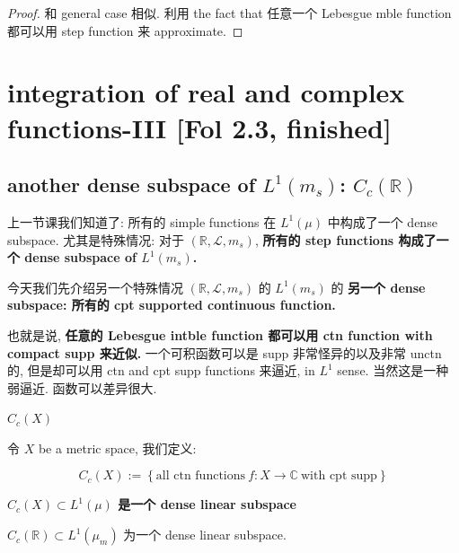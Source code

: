 \documentclass{qlnotes-export}
\begin{document}
\begin{proof}

和 general case 相似. 利用 the fact that 任意一个 Lebesgue mble function 都可以用 step function 来 approximate.

\end{proof}

\section{integration of real and complex functions-III {[}Fol 2.3, finished{]}}

\subsection{\texorpdfstring{another dense subspace of \(L^{1}(m_{s})\): \(C_{c}({\mathbb{R}})\)}{another dense subspace of L\^{}\{1\}(m\_\{s\}): C\_\{c\}(\{\textbackslash mathbb\{R\}\})}}\label{another-dense-subspace-of-l1m_s-c_cmathbbr}

上一节课我们知道了: 所有的 simple functions 在 \(L^{1}(\mu)\) 中构成了一个 dense subspace. 尤其是特殊情况: 对于 \(({\mathbb{R}},\mathcal{L},m_{s})\), \textbf{所有的 step functions 构成了一个 dense subspace of \(L^{1}(m_{s})\).}

今天我们先介绍另一个特殊情况 \(({\mathbb{R}},\mathcal{L},m_{s})\) 的 \(L^{1}(m_{s})\) 的 \textbf{另一个 dense subspace: 所有的 cpt supported continuous function.}

也就是说, \textbf{任意的 Lebesgue intble function 都可以用 ctn function with compact supp 来近似.} 一个可积函数可以是 supp 非常怪异的以及非常 unctn 的, 但是却可以用 ctn and cpt supp functions 来逼近, in \(L^{1}\) sense. 当然这是一种弱逼近. 函数可以差异很大.

\begin{definition}{\protect{}\label{kn-c-c-x}{\textbf{\(C_{c}(X)\)}}}

令 \(X\) be a metric space, 我们定义:

\[C_{c}(X) := \left\{ {\text{all ctn functions}\ f:X\rightarrow{\mathbb{C}}\ \text{with cpt supp}} \right\}\]

\end{definition}

\begin{theorem}{\protect{}\label{kn-c-c-x-subset-l-1-mu-dense-linear-subspace}{\textbf{\(C_{c}(X) \subset L^{1}(\mu)\)
是一个 dense linear subspace}}}

\(C_{c}({\mathbb{R}}) \subset L^{1}(\mu_{m})\) 为一个 dense linear subspace.

\end{theorem}
\end{document}
